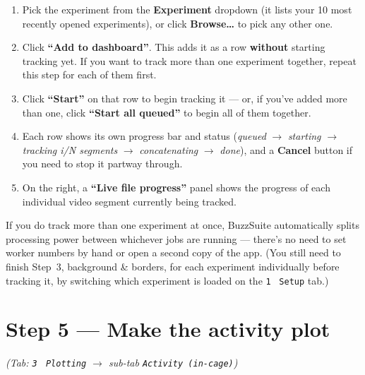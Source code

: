 \documentclass[11pt,a4paper]{article}
\begin{document}
\begin{enumerate}[leftmargin=*]
  \item Pick the experiment from the \textbf{Experiment} dropdown (it lists your 10 most recently
        opened experiments), or click \textbf{Browse\ldots} to pick any other one.

  \item Click \textbf{``Add to dashboard''}. This adds it as a row \textbf{without} starting
        tracking yet. If you want to track more than one experiment together, repeat this step
        for each of them first.

  \item Click \textbf{``Start''} on that row to begin tracking it --- or, if you've added more
        than one, click \textbf{``Start all queued''} to begin all of them together.

  \item Each row shows its own progress bar and status (\emph{queued} $\to$ \emph{starting}
        $\to$ \emph{tracking i/N segments} $\to$ \emph{concatenating} $\to$ \emph{done}), and a
        \textbf{Cancel} button if you need to stop it partway through.

  \item On the right, a \textbf{``Live file progress''} panel shows the progress of each
        individual video segment currently being tracked.
\end{enumerate}

If you do track more than one experiment at once, BuzzSuite automatically splits processing power
between whichever jobs are running --- there's no need to set worker numbers by hand or open a
second copy of the app. (You still need to finish Step~3, background \& borders, for each
experiment individually before tracking it, by switching which experiment is loaded on the
\texttt{1} \textperiodcentered\ \texttt{Setup} tab.)

\section{Step 5 --- Make the activity plot}
\textit{(Tab: \texttt{3} \textperiodcentered\ \texttt{Plotting} $\to$ sub-tab \texttt{Activity (in-cage)})}
\end{document}
